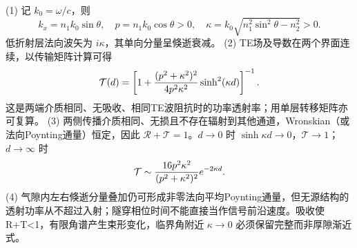 (1) 记 \(k_0=\omega/c\)，则
\[
k_x=n_1k_0\sin\theta,\quad p=n_1k_0\cos\theta>0,\quad
\kappa=k_0\sqrt{n_1^2\sin^2\theta-n_2^2}>0.
\]
低折射层法向波矢为 \(i\kappa\)，其单向分量呈倏逝衰减。
(2) TE场及导数在两个界面连续，以传输矩阵计算可得
\[
\mathcal T(d)=\left[1+{(p^2+\kappa^2)^2\over4p^2\kappa^2}
\sinh^2(\kappa d)\right]^{-1}.
\]
这是两端介质相同、无吸收、相同TE波阻抗时的功率透射率；用单层转移矩阵亦可复算。
(3) 两侧传播介质相同、无损且不存在辐射到其他通道，Wronskian（或法向Poynting通量）恒定，因此 \(\mathcal R+\mathcal T=1\)。\(d\to0\) 时 \(\sinh\kappa d\to0\)，\(\mathcal T\to1\)；\(d\to\infty\) 时
\[
\mathcal T\sim{16p^2\kappa^2\over(p^2+\kappa^2)^2}e^{-2\kappa d}.
\]
(4) 气隙内左右倏逝分量叠加仍可形成非零法向平均Poynting通量，但无源结构的透射功率从不超过入射；隧穿相位时间不能直接当作信号前沿速度。吸收使R+T<1，有限角谱产生束形变化，临界角附近 \(\kappa\to0\) 必须保留完整而非厚隙渐近式。
